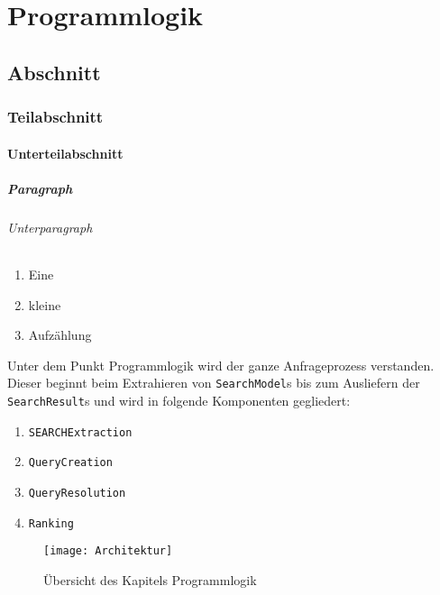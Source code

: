 
\chapter{Programmlogik}
\section{Abschnitt}
\subsection{Teilabschnitt}
\subsubsection{Unterteilabschnitt}
\paragraph{Paragraph}
\subparagraph{Unterparagraph}

\begin{enumerate}
     \item Eine
     \item kleine
     \item Aufzählung
\end{enumerate}

Unter dem Punkt Programmlogik wird der ganze Anfrageprozess verstanden. Dieser beginnt beim Extrahieren von \lstinline|SearchModel|s bis zum Ausliefern der \lstinline|SearchResult|s und wird in folgende Komponenten gegliedert:

\begin{enumerate}
     \item \lstinline|SEARCHExtraction|
     \item \lstinline|QueryCreation|
     \item \lstinline|QueryResolution|
     \item \lstinline|Ranking|
\end{enumerate}

\begin{figure}[htb]
  \centering
  \texttt{[image: Architektur]}
  \caption{Übersicht des Kapitels Programmlogik}
\end{figure}

